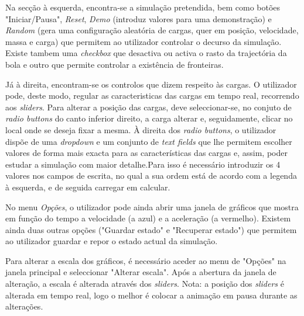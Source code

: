 \documentclass[a4paper,11pt]{article}
\begin{document}
Na secção à esquerda, encontra-se a simulação pretendida, bem como botões "Iniciar/Pausa", \emph{Reset}, \emph{Demo} (introduz valores para uma demonstração) e \emph{Random} (gera uma configuração aleatória de cargas, quer em posição, velocidade, massa e carga) que permitem ao utilizador controlar o decurso da simulação. Existe tambem uma \emph{checkbox} que desactiva ou activa o rasto da trajectória da bola e outro que permite controlar a existência de fronteiras.


Já à direita, encontram-se os controlos que dizem respeito às cargas. O utilizador pode, deste modo, regular as caracteristicas das cargas em tempo real, recorrendo aos \emph{sliders}. Para alterar a posição das cargas, deve seleccionar-se, no conjuto de \emph{radio buttons} do canto inferior direito, a carga alterar e, seguidamente, clicar no local onde se deseja fixar a mesma. À direita dos \emph{radio buttons}, o utilizador dispõe de uma \emph{dropdown} e um conjunto de \emph{text fields} que lhe permitem escolher valores de forma mais exacta para as características das cargas e, assim, poder estudar a simulação com maior detalhe.Para isso é necessário introduzir os 4 valores nos campos de escrita, no qual a sua ordem está de acordo com a legenda à esquerda, e de seguida carregar em calcular.


No menu \emph{Opções}, o utilizador pode ainda abrir uma janela de gráficos que mostra em função do tempo a velocidade (a azul) e a aceleração (a vermelho). Existem ainda duas outras opções ("Guardar estado" e "Recuperar estado") que permitem ao utilizador guardar e repor o estado actual da simulação.

Para alterar a escala dos gráficos, é necessário aceder ao menu de "Opções" na janela principal e seleccionar "Alterar escala". Após a abertura da janela de alteração, a escala é alterada através dos \emph{sliders}. Nota: a posição dos \emph{sliders} é alterada em tempo real, logo o melhor é colocar a animação em pausa durante as alterações.
\end{document}
